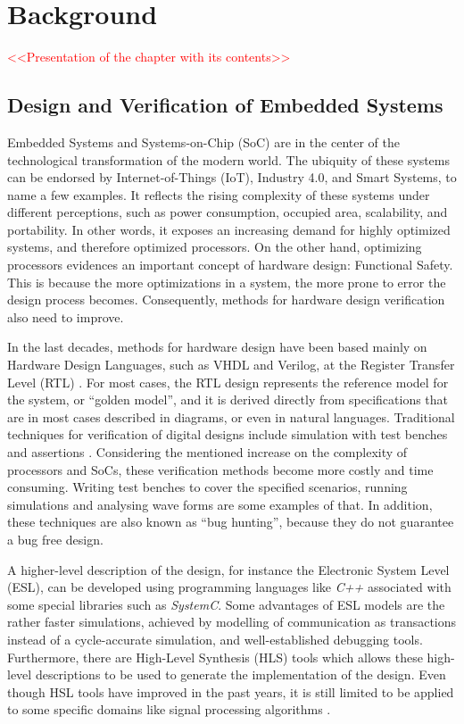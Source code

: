 \chapter{Background}

\textcolor{red}{<<Presentation of the chapter with its contents>>}

\section{Design and Verification of Embedded Systems}

Embedded Systems and Systems-on-Chip (SoC) are in the center of the technological transformation of the modern world. The ubiquity of these systems can be endorsed by Internet-of-Things (IoT), Industry 4.0, and Smart Systems, to name a few examples. It reflects the rising complexity of these systems under different perceptions, such as power consumption, occupied area, scalability, and portability. In other words, it exposes an increasing demand for highly optimized systems, and therefore optimized processors. On the other hand, optimizing processors evidences an important concept of hardware design: Functional Safety. This is because the more optimizations in a system, the more prone to error the design process becomes. Consequently, methods for hardware design verification also need to improve.

In the last decades, methods for hardware design have been based mainly on Hardware Design Languages, such as VHDL and Verilog, at the Register Transfer Level (RTL) \cite{paper-pdd}. For most cases, the RTL design represents the reference model for the system, or “golden model”, and it is derived directly from specifications that are in most cases described in diagrams, or even in natural languages. Traditional techniques for verification of digital designs include simulation with test benches and assertions \cite{paper-symbolic}. Considering the mentioned increase on the complexity of processors and SoCs, these verification methods become more costly and time consuming. Writing test benches to cover the specified scenarios, running simulations and analysing wave forms are some examples of that. In addition, these techniques are also known as “bug hunting”, because they do not guarantee a bug free design. 

A higher-level description of the design, for instance the Electronic System Level (ESL), can be developed using programming languages like \textit{C++} associated with some special libraries such as \textit{SystemC}. Some advantages of ESL models are the rather faster simulations, achieved by modelling of communication as transactions instead of a cycle-accurate simulation, and well-established debugging tools. Furthermore, there are High-Level Synthesis (HLS) tools which allows these high-level descriptions to be used to generate the implementation of the design. Even though HSL tools have improved in the past years, it is still limited to be applied to some specific domains like signal processing algorithms \cite{paper-pdd}. 

